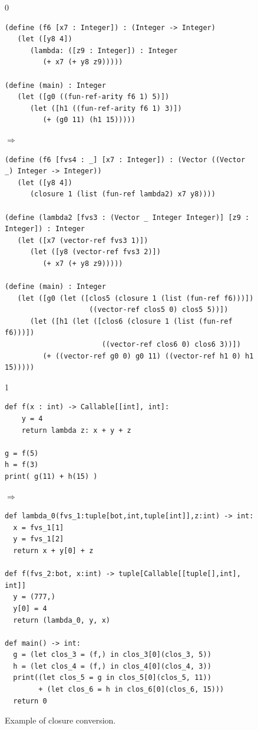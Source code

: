 \documentclass[7x10,nocrop]{TimesAPriori_MIT}%
\def\racketEd{0}
\def\pythonEd{1}
\def\edition{1}
\begin{document}
\begin{figure}[tbp]
  \begin{minipage}{0.8\textwidth}
{\if\edition\racketEd
\begin{lstlisting}[basicstyle=\ttfamily\footnotesize]
(define (f6 [x7 : Integer]) : (Integer -> Integer)
   (let ([y8 4])
      (lambda: ([z9 : Integer]) : Integer
         (+ x7 (+ y8 z9)))))

(define (main) : Integer
   (let ([g0 ((fun-ref-arity f6 1) 5)])
      (let ([h1 ((fun-ref-arity f6 1) 3)])
         (+ (g0 11) (h1 15)))))
\end{lstlisting}
$\Rightarrow$
\begin{lstlisting}[basicstyle=\ttfamily\footnotesize]
(define (f6 [fvs4 : _] [x7 : Integer]) : (Vector ((Vector _) Integer -> Integer))
   (let ([y8 4])
      (closure 1 (list (fun-ref lambda2) x7 y8))))

(define (lambda2 [fvs3 : (Vector _ Integer Integer)] [z9 : Integer]) : Integer
   (let ([x7 (vector-ref fvs3 1)])
      (let ([y8 (vector-ref fvs3 2)])
         (+ x7 (+ y8 z9)))))

(define (main) : Integer
   (let ([g0 (let ([clos5 (closure 1 (list (fun-ref f6)))])
                    ((vector-ref clos5 0) clos5 5))])
      (let ([h1 (let ([clos6 (closure 1 (list (fun-ref f6)))])
                       ((vector-ref clos6 0) clos6 3))])
         (+ ((vector-ref g0 0) g0 11) ((vector-ref h1 0) h1 15)))))
\end{lstlisting}
\fi}
%
{\if\edition\pythonEd
\begin{lstlisting}
def f(x : int) -> Callable[[int], int]:
    y = 4
    return lambda z: x + y + z

g = f(5)
h = f(3)
print( g(11) + h(15) )
\end{lstlisting}
$\Rightarrow$
\begin{lstlisting}
def lambda_0(fvs_1:tuple[bot,int,tuple[int]],z:int) -> int:
  x = fvs_1[1]
  y = fvs_1[2]
  return x + y[0] + z

def f(fvs_2:bot, x:int) -> tuple[Callable[[tuple[],int], int]]
  y = (777,)
  y[0] = 4
  return (lambda_0, y, x)

def main() -> int:
  g = (let clos_3 = (f,) in clos_3[0](clos_3, 5))
  h = (let clos_4 = (f,) in clos_4[0](clos_4, 3))
  print((let clos_5 = g in clos_5[0](clos_5, 11))
        + (let clos_6 = h in clos_6[0](clos_6, 15)))
  return 0
\end{lstlisting}
\fi}
\end{minipage}
\caption{Example of closure conversion.}
\label{fig:lexical-functions-example}
\end{figure}
\end{document}
